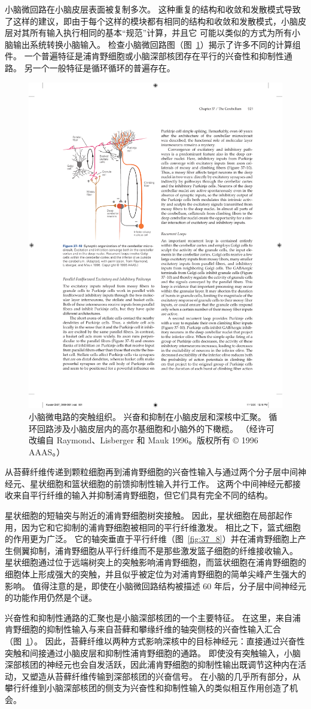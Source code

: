 小脑微回路在小脑皮层表面被复制多次。
这种重复的结构和收敛和发散模式导致了这样的建议，即由于每个这样的模块都有相同的结构和收敛和发散模式，小脑皮层对其所有输入执行相同的基本“规范”计算，并且它 可能以类似的方式为所有小脑输出系统转换小脑输入。
检查小脑微回路图（图~\ref{fig:37_10}）揭示了许多不同的计算组件。
一个普遍特征是浦肯野细胞或小脑深部核团存在平行的兴奋性和抑制性通路。 另一个一般特征是循环循环的普遍存在。


\begin{figure}[htbp]
	\centering
	\includegraphics[width=0.5\linewidth]{chap37/fig_37_10}
	\caption{小脑微电路的突触组织。 兴奋和抑制在小脑皮层和深核中汇聚。 循环回路涉及小脑皮层内的高尔基细胞和小脑外的下橄榄。 （经许可改编自 Raymond、Lisberger 和 Mauk 1996。版权所有 © 1996 AAAS。）}
	\label{fig:37_10}
\end{figure}


从苔藓纤维传递到颗粒细胞再到浦肯野细胞的兴奋性输入与通过两个分子层中间神经元、星状细胞和篮状细胞的前馈抑制性输入并行工作。
这两个中间神经元都接收来自平行纤维的输入并抑制浦肯野细胞，但它们具有完全不同的结构。


星状细胞的短轴突与附近的浦肯野细胞树突接触。
因此，星状细胞在局部起作用，因为它和它抑制的浦肯野细胞被相同的平行纤维激发。
相比之下，篮式细胞的作用更为广泛。 它的轴突垂直于平行纤维（图~\ref{fig:37_8}）并在浦肯野细胞上产生侧翼抑制，浦肯野细胞从平行纤维而不是那些激发篮子细胞的纤维接收输入。
星状细胞通过位于远端树突上的突触影响浦肯野细胞，而篮状细胞在浦肯野细胞的细胞体上形成强大的突触，并且似乎被定位为对浦肯野细胞的简单尖峰产生强大的影响。
值得注意的是，即使在小脑微回路结构被描述 60 年后，分子层中间神经元的功能作用仍然是个谜。


兴奋性和抑制性通路的汇聚也是小脑深部核团的一个主要特征。
在这里，来自浦肯野细胞的抑制性输入与来自苔藓和攀缘纤维的轴突侧枝的兴奋性输入汇合（图~\ref{fig:37_10}）。
因此，苔藓纤维以两种方式影响深核中的目标神经元：直接通过兴奋性突触和间接通过小脑皮层和抑制性浦肯野细胞的通路。
即使没有突触输入，小脑深部核团的神经元也会自发活跃，因此浦肯野细胞的抑制性输出既调节这种内在活动，又塑造从苔藓纤维传输到深部核团的兴奋信号。
在小脑的几乎所有部分，从攀行纤维到小脑深部核团的侧支为兴奋性和抑制性输入的类似相互作用创造了机会。



